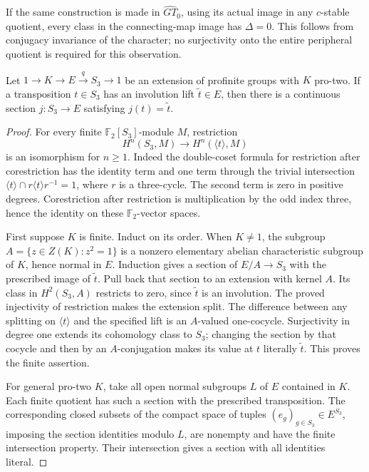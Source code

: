 If the same construction is made in \(\widehat{GT}_0\),
using its actual image in any \(c\)-stable quotient,
every class in the connecting-map image has \(\Delta=0\).
This follows from conjugacy invariance of the character;
no surjectivity onto the entire peripheral quotient is
required for this observation.

Let \(1\to K\to E\xrightarrow{q}S_3\to1\) be an extension
of profinite groups with \(K\) pro-two. If a transposition
\(t\in S_3\) has an involution lift \(\widetilde t\in E\),
then there is a continuous section \(j:S_3\to E\) satisfying
\(j(t)=\widetilde t\).

\begin{proof}
For every finite \(\mathbb F_2[S_3]\)-module \(M\), restriction
\[
 H^n(S_3,M)\longrightarrow H^n(\langle t\rangle,M)
\]
is an isomorphism for \(n\geq1\). Indeed the double-coset
formula for restriction after corestriction has the identity
term and one term through the trivial intersection
\(\langle t\rangle\cap r\langle t\rangle r^{-1}=1\),
where \(r\) is a three-cycle. The second term is zero
in positive degrees. Corestriction after restriction is
multiplication by the odd index three, hence the identity
on these \(\mathbb F_2\)-vector spaces.

First suppose \(K\) is finite. Induct on its order.
When \(K\ne1\), the subgroup
\(A=\{z\in Z(K):z^2=1\}\) is a nonzero elementary
abelian characteristic subgroup of \(K\), hence normal
in \(E\). Induction gives a section of \(E/A\to S_3\)
with the prescribed image of \(\widetilde t\).
Pull back that section to an extension with kernel \(A\).
Its class in \(H^2(S_3,A)\) restricts to zero, since
\(\widetilde t\) is an involution. The proved injectivity
of restriction makes the extension split.
The difference between any splitting on \(\langle t\rangle\)
and the specified lift is an \(A\)-valued one-cocycle.
Surjectivity in degree one extends its cohomology class to
\(S_3\); changing the section by that cocycle and then by
an \(A\)-conjugation makes its value at \(t\) literally
\(\widetilde t\). This proves the finite assertion.

For general pro-two \(K\), take all open normal subgroups
\(L\) of \(E\) contained in \(K\). Each finite quotient
has such a section with the prescribed transposition.
The corresponding closed subsets of the compact space
of tuples \((e_g)_{g\in S_3}\in E^{S_3}\), imposing the
section identities modulo \(L\), are nonempty and have
the finite intersection property. Their intersection
gives a section with all identities literal.
\end{proof}

